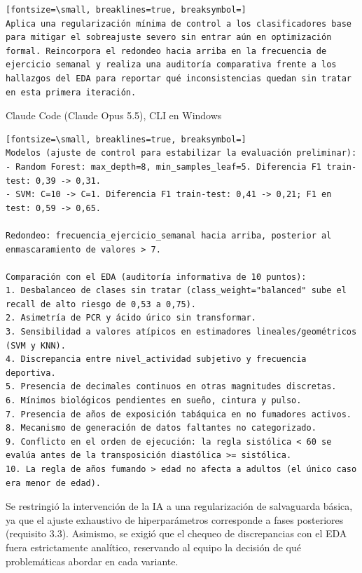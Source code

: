 \documentclass[12pt,a4paper,oneside]{book}
\begin{document}
\begin{iaprompt}
\begin{Verbatim}[fontsize=\small, breaklines=true, breaksymbol=]
Aplica una regularización mínima de control a los clasificadores base para mitigar el sobreajuste severo sin entrar aún en optimización formal. Reincorpora el redondeo hacia arriba en la frecuencia de ejercicio semanal y realiza una auditoría comparativa frente a los hallazgos del EDA para reportar qué inconsistencias quedan sin tratar en esta primera iteración.
\end{Verbatim}
\end{iaprompt}
\begin{iaresp}{Claude Code (Claude Opus 5.5), CLI en Windows}
\begin{Verbatim}[fontsize=\small, breaklines=true, breaksymbol=]
Modelos (ajuste de control para estabilizar la evaluación preliminar):
- Random Forest: max_depth=8, min_samples_leaf=5. Diferencia F1 train-test: 0,39 -> 0,31.
- SVM: C=10 -> C=1. Diferencia F1 train-test: 0,41 -> 0,21; F1 en test: 0,59 -> 0,65.

Redondeo: frecuencia_ejercicio_semanal hacia arriba, posterior al enmascaramiento de valores > 7.

Comparación con el EDA (auditoría informativa de 10 puntos):
1. Desbalanceo de clases sin tratar (class_weight="balanced" sube el recall de alto riesgo de 0,53 a 0,75).
2. Asimetría de PCR y ácido úrico sin transformar.
3. Sensibilidad a valores atípicos en estimadores lineales/geométricos (SVM y KNN).
4. Discrepancia entre nivel_actividad subjetivo y frecuencia deportiva.
5. Presencia de decimales continuos en otras magnitudes discretas.
6. Mínimos biológicos pendientes en sueño, cintura y pulso.
7. Presencia de años de exposición tabáquica en no fumadores activos.
8. Mecanismo de generación de datos faltantes no categorizado.
9. Conflicto en el orden de ejecución: la regla sistólica < 60 se evalúa antes de la transposición diastólica >= sistólica.
10. La regla de años fumando > edad no afecta a adultos (el único caso era menor de edad).
\end{Verbatim}
\end{iaresp}
\begin{iaanalisis}
Se restringió la intervención de la IA a una regularización de salvaguarda básica, ya que el ajuste exhaustivo de hiperparámetros corresponde a fases posteriores (requisito 3.3). Asimismo, se exigió que el chequeo de discrepancias con el EDA fuera estrictamente analítico, reservando al equipo la decisión de qué problemáticas abordar en cada variante.
\end{iaanalisis}
\end{document}
